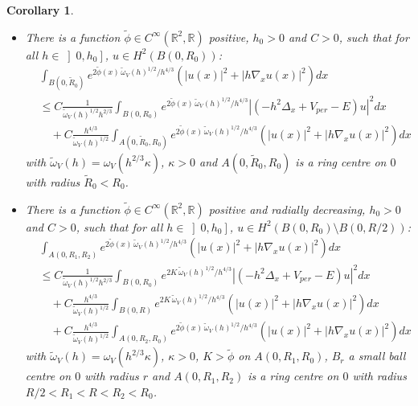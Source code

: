 \documentclass[leqno,11pt,letterpaper, english]{amsart}
\newcommand{\nn}{\nonumber}
\theoremstyle{plain}
\newtheorem{cor}[prop]{Corollary}
\theoremstyle{definition}
\numberwithin{equation}{section}
\begin{document}
\begin{cor}
\label{cor: cor2}
\hfill\\
\begin{itemize}
\item There is a function $\tilde{\phi} \in C^\infty(\mathbb{R}^2,\mathbb{R})$ positive, $h_0 >0 $ and $C>0$, such that for all $ h\in \left]0, h_0 \right]$, $u \in H^2(B(0,R_0))$:
\begin{align}
    &\int_{B(0,\tilde{R}_0)} e^{2\tilde{\phi}(x)\,\tilde{\omega}_V(h)^{1/2}/ h^{4/3}} (|u(x)|^2 +|h\nabla_x u(x)|^2)dx\nn\\
    &\leq C \frac{1}{\tilde{\omega}_V(h)^{1/2}h^{2/3}}\int_{B(0,R_0)} e^{2\tilde{\phi}(x)\,\tilde{\omega}_V(h)^{1/2}/ h^{4/3}}|(-h^2\Delta_x + V_{per}- E)u|^2dx\nn\\
    &\quad +C \frac{h^{4/3}}{\tilde{\omega}_V(h)^{1/2}}\int_{A(0,\tilde{R}_0,R_0)} e^{2\tilde{\phi}(x)\,\tilde{\omega}_V(h)^{1/2}/ h^{4/3}} (|u(x)|^2 +|h\nabla_x u(x)|^2)dx
\end{align}
with $\tilde{\omega}_V(h)=\omega_V( h^{2/3}\kappa)$, $\kappa>0$ and $A(0,\tilde{R}_0,R_0)$ is a ring centre on $0$ with radius $\tilde{R}_0<R_0$.
 
\item There is a function $\tilde{\phi} \in C^\infty(\mathbb{R}^2,\mathbb{R})$ positive and radially decreasing, $h_0 >0 $ and $C>0$, such that for all $ h\in \left]0, h_0 \right]$, $u \in H^2(B(0,R_0)\setminus B(0,R/2))$:
\begin{align}
    &\int_{A(0,R_1,R_2)} e^{2\tilde{\phi}(x)\,\tilde{\omega}_V(h)^{1/2}/ h^{4/3}} (|u(x)|^2 +|h\nabla_x u(x)|^2)dx\nn\\
    &\leq C \frac{1}{\tilde{\omega}_V(h)^{1/2}h^{2/3}}\int_{B(0,R_0)} e^{2K\,\tilde{\omega}_V(h)^{1/2}/ h^{4/3}}|(-h^2\Delta_x + V_{per}- E)u|^2dx\nn\\
    &\quad + C \frac{h^{4/3}}{\tilde{\omega}_V(h)^{1/2}}\int_{B(0,R)} e^{2K\,\tilde{\omega}_V(h)^{1/2}/ h^{4/3}} (|u(x)|^2 +|h\nabla_x u(x)|^2)dx\nn\\
    &\quad +C \frac{h^{4/3}}{\tilde{\omega}_V(h)^{1/2}}\int_{A(0,R_2,R_0)} e^{2\tilde{\phi}(x)\,\tilde{\omega}_V(h)^{1/2}/ h^{4/3}} (|u(x)|^2 +|h\nabla_x u(x)|^2)dx
\end{align}
with $\tilde{\omega}_V(h)=\omega_V( h^{2/3}\kappa)$, $\kappa>0$, $K>\tilde{\phi}$ on $A(0,R_1,R_0)$, $B_r$ a small ball centre on $0$ with radius $r$ and $A(0,R_1,R_2)$ is a ring centre on $0$ with radius $R/2<R_1<R<R_2<R_0$.
\end{itemize}
\end{cor}
\end{document}
